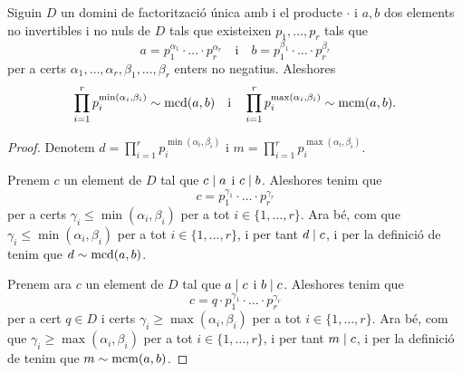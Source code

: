 \documentclass[../Apunts.tex]{subfiles}
\begin{document}
	\begin{proposition}
		Siguin \(D\) un domini de factorització única amb i el producte \(\cdot\) i \(a,b\) dos elements no invertibles i no nuls de \(D\) tals que existeixen \(p_{1},\dots,p_{r}\) tals que
		\[a=p_{1}^{\alpha_{1}}\cdot\ldots\cdot p_{r}^{\alpha_{r}}\quad\text{i}\quad b=p_{1}^{\beta_{1}}\cdot\ldots\cdot p_{r}^{\beta_{r}}\]
		per a certs \(\alpha_{1},\dots,\alpha_{r},\beta_{1},\dots,\beta_{r}\) enters no negatius. Aleshores
		\[\prod_{i=1}^{r}p_{i}^{\min(\alpha_{i},\beta_{i})}\sim\operatorname{mcd}(a,b)\quad\text{i}\quad\prod_{i=1}^{r}p_{i}^{\max(\alpha_{i},\beta_{i})}\sim\operatorname{mcm}(a,b).\]
		\begin{proof}
			Denotem \(d=\prod_{i=1}^{r}p_{i}^{\min(\alpha_{i},\beta_{i})}\) i \(m=\prod_{i=1}^{r}p_{i}^{\max(\alpha_{i},\beta_{i})}\).
			
			Prenem \(c\) un element de \(D\) tal que \(c\mathrel{|} a\) i \(c\mathrel{|} b\). Aleshores tenim que
			\[c=p_{1}^{\gamma_{1}}\cdot\ldots\cdot p_{r}^{\gamma_{r}}\]
			per a certs \(\gamma_{i}\leq\min(\alpha_{i},\beta_{i})\) per a tot \(i\in\{1,\dots,r\}\). Ara bé, com que \(\gamma_{i}\leq\min(\alpha_{i},\beta_{i})\) per a tot \(i\in\{1,\dots,r\}\), i per tant \(d\mathrel{|} c\), i per la definició de  tenim que \(d\sim\operatorname{mcd}(a,b)\).
			
			Prenem ara \(c\) un element de \(D\) tal que \(a\mathrel{|} c\) i \(b\mathrel{|} c\). Aleshores tenim que
			\[c=q\cdot p_{1}^{\gamma_{1}}\cdot\ldots\cdot p_{r}^{\gamma_{r}}\]
			per a cert \(q\in D\) i certs \(\gamma_{i}\geq\max(\alpha_{i},\beta_{i})\) per a tot \(i\in\{1,\dots,r\}\). Ara bé, com que \(\gamma_{i}\geq\max(\alpha_{i},\beta_{i})\) per a tot \(i\in\{1,\dots,r\}\), i per tant \(m\mathrel{|} c\), i per la definició de  tenim que \(m\sim\operatorname{mcm}(a,b)\).
		\end{proof}
	\end{proposition}
\end{document}
